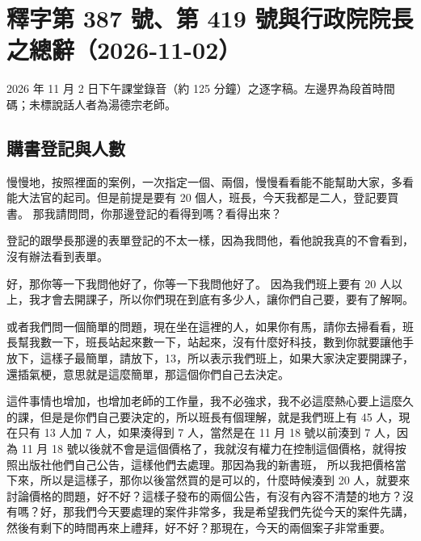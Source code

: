 \chapter{釋字第 387 號、第 419 號與行政院院長之總辭（2026-11-02）}

2026 年 11 月 2 日下午課堂錄音（約 125 分鐘）之逐字稿。左邊界為段首時間碼；未標說話人者為湯德宗老師。


\section{購書登記與人數}

\hypertarget{c08:cue:1}{}慢慢地，按照裡面的案例，一次指定一個、兩個，慢慢看看能不能幫助大家，多看能大法官的起司。但是前提是要有 20 個人，班長，今天我都是二人，登記要買書。
\hypertarget{c08:cue:2}{}那我請問問，你那邊登記的看得到嗎？看得出來？

\hypertarget{c08:cue:3}{}登記的跟學長那邊的表單登記的不太一樣，因為我問他，看他說我真的不會看到，沒有辦法看到表單。

\hypertarget{c08:cue:4}{}好，那你等一下我問他好了，你等一下我問他好了。
\hypertarget{c08:cue:5}{}因為我們班上要有 20 人以上，我才會去開課子，所以你們現在到底有多少人，讓你們自己要，要有了解啊。

\hypertarget{c08:cue:6}{}或者我們問一個簡單的問題，現在坐在這裡的人，如果你有馬，請你去掃看看，班長幫我數一下，班長站起來數一下，站起來，沒有什麼好科技，數到你就要讓他手放下，這樣子最簡單，請放下，13，所以表示我們班上，如果大家決定要開課子，還插氣梗，意思就是這麼簡單，那這個你們自己去決定。

\hypertarget{c08:cue:7}{}這件事情也增加，也增加老師的工作量，我不必強求，我不必這麼熱心要上這麼久的課，但是是你們自己要決定的，所以班長有個理解，就是我們班上有 45 人，現在只有 13 人加 7 人，如果湊得到 7 人，當然是在 11 月 18 號以前湊到 7 人，因為 11 月 18 號以後就不會是這個價格了，我就沒有權力在控制這個價格，就得按照出版社他們自己公告，這樣他們去處理。那因為我的新書班，
\hypertarget{c08:cue:8}{}所以我把價格當下來，所以是這樣子，那你以後當然買的是可以的，什麼時候湊到 20 人，就要來討論價格的問題，好不好？這樣子發布的兩個公告，有沒有內容不清楚的地方？沒有嗎？好，那我們今天要處理的案件非常多，我是希望我們先從今天的案件先講，然後有剩下的時間再來上禮拜，好不好？那現在，今天的兩個案子非常重要。

